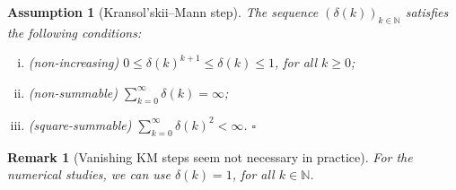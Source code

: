 \documentclass[10pt]{article}
\newtheorem{remark}{Remark}{\it}{}
\newtheorem{assumption}{Assumption}{\it}{}
\newcommand{\bb}{\mathbb}
\newcommand{\0}{\mathbf{0}}
\newcommand{\1}{\mathbf{1}}
\begin{document}
\begin{assumption}[Kransol'skii--Mann step] \label{ass:van-ss} The sequence $( \delta(k) )_{k \in \bb N}$ satisfies the following conditions:
\begin{enumerate}[(i)]
\item (non-increasing) $0 \le \delta(k)^{k+1} \le \delta(k) \le 1$, for all $k \ge 0$;
\item (non-summable) $\sum_{k=0}^\infty \delta(k) = \infty$;
\item (square-summable) $\sum_{k=0}^\infty {\delta(k)}^2 < \infty$.
{\hfill $\square$}
\end{enumerate}
\end{assumption}

\begin{remark}[Vanishing KM steps seem not necessary in practice]
For the numerical studies, we can use $\delta(k)=1$, for all $k \in \bb N$.
\end{remark}
\end{document}
